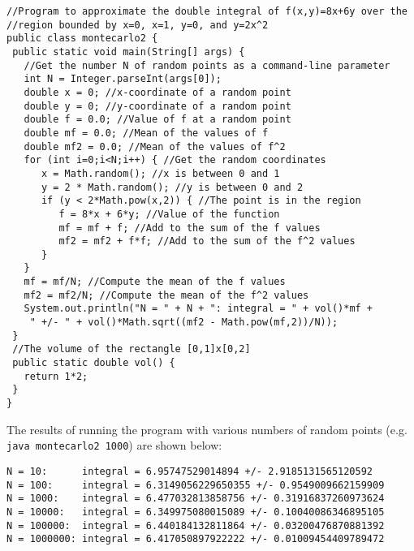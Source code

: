 \medskip
{}
\begin{lstlisting}
//Program to approximate the double integral of f(x,y)=8x+6y over the
//region bounded by x=0, x=1, y=0, and y=2x^2
public class montecarlo2 {
 public static void main(String[] args) {
   //Get the number N of random points as a command-line parameter
   int N = Integer.parseInt(args[0]);
   double x = 0; //x-coordinate of a random point
   double y = 0; //y-coordinate of a random point
   double f = 0.0; //Value of f at a random point
   double mf = 0.0; //Mean of the values of f
   double mf2 = 0.0; //Mean of the values of f^2
   for (int i=0;i<N;i++) { //Get the random coordinates
      x = Math.random(); //x is between 0 and 1
      y = 2 * Math.random(); //y is between 0 and 2
      if (y < 2*Math.pow(x,2)) { //The point is in the region
         f = 8*x + 6*y; //Value of the function
         mf = mf + f; //Add to the sum of the f values
         mf2 = mf2 + f*f; //Add to the sum of the f^2 values
      }
   }
   mf = mf/N; //Compute the mean of the f values
   mf2 = mf2/N; //Compute the mean of the f^2 values
   System.out.println("N = " + N + ": integral = " + vol()*mf +
    " +/- " + vol()*Math.sqrt((mf2 - Math.pow(mf,2))/N));
 }
 //The volume of the rectangle [0,1]x[0,2]
 public static double vol() {
   return 1*2;
 }
}
\end{lstlisting}

The results of running the program with various numbers of random points (e.g. \texttt{java montecarlo2 1000})
are shown below:

\begin{verbatim}
N = 10:      integral = 6.95747529014894 +/- 2.9185131565120592
N = 100:     integral = 6.3149056229650355 +/- 0.9549009662159909
N = 1000:    integral = 6.477032813858756 +/- 0.31916837260973624
N = 10000:   integral = 6.349975080015089 +/- 0.10040086346895105
N = 100000:  integral = 6.440184132811864 +/- 0.03200476870881392
N = 1000000: integral = 6.417050897922222 +/- 0.01009454409789472
\end{verbatim}

